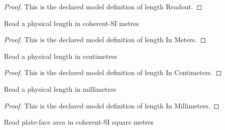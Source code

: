\begin{proof}
  This is the declared model definition of length Readout.
\end{proof}
\begin{definition}
  \label{def:physics:phyx-mini-0908:phyxminiproblems-problemphyxmini0908-lengthinmeters}
  Read a physical length in coherent-SI metres
\end{definition}
\begin{proof}
  This is the declared model definition of length In Meters.
\end{proof}
\begin{definition}
  \label{def:physics:phyx-mini-0908:phyxminiproblems-problemphyxmini0908-lengthincentimeters}
  Read a physical length in centimetres
\end{definition}
\begin{proof}
  This is the declared model definition of length In Centimeters.
\end{proof}
\begin{definition}
  \label{def:physics:phyx-mini-0908:phyxminiproblems-problemphyxmini0908-lengthinmillimeters}
  Read a physical length in millimetres
\end{definition}
\begin{proof}
  This is the declared model definition of length In Millimeters.
\end{proof}
\begin{definition}
  \label{def:physics:phyx-mini-0908:phyxminiproblems-problemphyxmini0908-areainsquaremeters}
  Read plate-face area in coherent-SI square metres
\end{definition}
